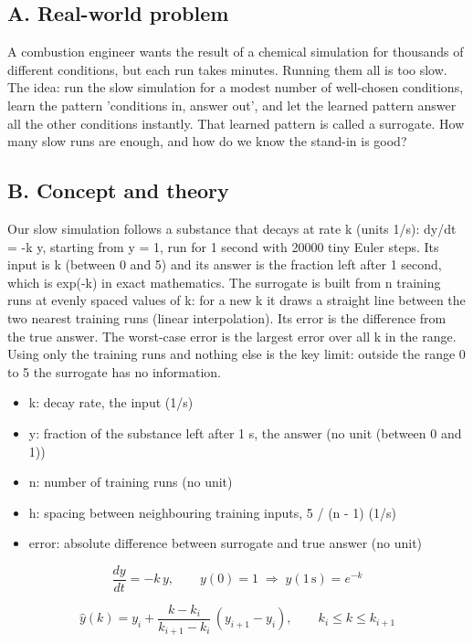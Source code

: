 \documentclass[11pt,a4paper]{article}
\begin{document}
\subsection*{A. Real-world problem}
A combustion engineer wants the result of a chemical simulation for thousands of different conditions, but each run takes minutes. Running them all is too slow. The idea: run the slow simulation for a modest number of well-chosen conditions, learn the pattern 'conditions in, answer out', and let the learned pattern answer all the other conditions instantly. That learned pattern is called a surrogate. How many slow runs are enough, and how do we know the stand-in is good?

\subsection*{B. Concept and theory}
Our slow simulation follows a substance that decays at rate k (units 1/s): dy/dt = -k y, starting from y = 1, run for 1 second with 20000 tiny Euler steps. Its input is k (between 0 and 5) and its answer is the fraction left after 1 second, which is exp(-k) in exact mathematics. The surrogate is built from n training runs at evenly spaced values of k: for a new k it draws a straight line between the two nearest training runs (linear interpolation). Its error is the difference from the true answer. The worst-case error is the largest error over all k in the range. Using only the training runs and nothing else is the key limit: outside the range 0 to 5 the surrogate has no information.

\begin{itemize}[nosep]
\item k: decay rate, the input (1/s)
\item y: fraction of the substance left after 1 s, the answer (no unit (between 0 and 1))
\item n: number of training runs (no unit)
\item h: spacing between neighbouring training inputs, 5 / (n - 1) (1/s)
\item error: absolute difference between surrogate and true answer (no unit)
\end{itemize}

\begin{equation*}
\frac{dy}{dt}=-k\,y,\qquad y(0)=1\;\Rightarrow\;y(1\,\mathrm{s})=e^{-k}
\end{equation*}

\begin{equation*}
\hat y(k)=y_i+\frac{k-k_i}{k_{i+1}-k_i}\,(y_{i+1}-y_i),\qquad k_i\le k\le k_{i+1}
\end{equation*}
\end{document}

